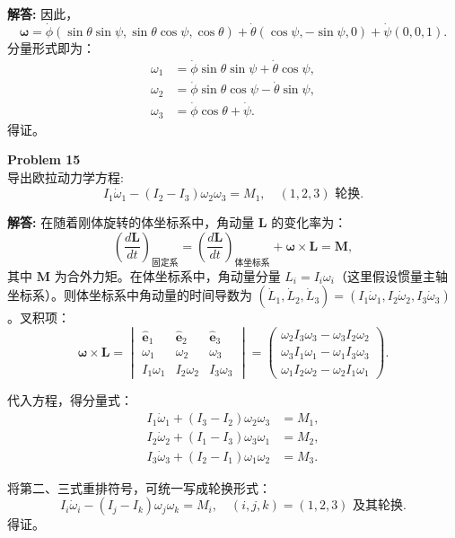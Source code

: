 \documentclass[12pt, a4paper, oneside]{ctexart}
\newenvironment{solution}{\par\noindent\textbf{解答:}\quad}{\par}
\begin{document}
\begin{solution}
    因此，
    \[
    \boldsymbol{\omega} = \dot{\phi} (\sin\theta \sin\psi, \sin\theta \cos\psi, \cos\theta) + \dot{\theta} (\cos\psi, -\sin\psi, 0) + \dot{\psi} (0,0,1).
    \]
    分量形式即为：
    \[
    \begin{aligned}
        \omega_1 &= \dot{\phi} \sin\theta \sin\psi + \dot{\theta} \cos\psi, \\
        \omega_2 &= \dot{\phi} \sin\theta \cos\psi - \dot{\theta} \sin\psi, \\
        \omega_3 &= \dot{\phi} \cos\theta + \dot{\psi}.
    \end{aligned}
    \]
    得证。
\end{solution}

\begin{mdframed}[backgroundcolor=gray!10, linewidth=0pt]
    \textbf{Problem 15} \\
    导出欧拉动力学方程:
    \[
    I_1\dot{\omega}_1 - (I_2 - I_3) \omega_2 \omega_3 = M_1, \quad (1,2,3) \text{ 轮换}.
    \]
\end{mdframed}
\begin{solution}
    在随着刚体旋转的体坐标系中，角动量 \(\mathbf{L}\) 的变化率为：
    \[
    \left( \frac{d \mathbf{L}}{dt} \right)_{\text{固定系}} = \left( \frac{d \mathbf{L}}{dt} \right)_{\text{体坐标系}} + \boldsymbol{\omega} \times \mathbf{L} = \mathbf{M},
    \]
    其中 \(\mathbf{M}\) 为合外力矩。在体坐标系中，角动量分量 \(L_i = I_i \omega_i\)（这里假设惯量主轴坐标系）。则体坐标系中角动量的时间导数为 \(( \dot{L}_1, \dot{L}_2, \dot{L}_3 ) = ( I_1 \dot{\omega}_1, I_2 \dot{\omega}_2, I_3 \dot{\omega}_3 )\)。叉积项：
    \[
    \boldsymbol{\omega} \times \mathbf{L} =
    \begin{vmatrix}
        \hat{\mathbf{e}}_1 & \hat{\mathbf{e}}_2 & \hat{\mathbf{e}}_3 \\
        \omega_1 & \omega_2 & \omega_3 \\
        I_1 \omega_1 & I_2 \omega_2 & I_3 \omega_3
    \end{vmatrix}
    = \begin{pmatrix}
        \omega_2 I_3 \omega_3 - \omega_3 I_2 \omega_2 \\
        \omega_3 I_1 \omega_1 - \omega_1 I_3 \omega_3 \\
        \omega_1 I_2 \omega_2 - \omega_2 I_1 \omega_1
    \end{pmatrix}.
    \]
    
    代入方程，得分量式：
    \[
    \begin{aligned}
        I_1 \dot{\omega}_1 + (I_3 - I_2) \omega_2 \omega_3 &= M_1, \\
        I_2 \dot{\omega}_2 + (I_1 - I_3) \omega_3 \omega_1 &= M_2, \\
        I_3 \dot{\omega}_3 + (I_2 - I_1) \omega_1 \omega_2 &= M_3.
    \end{aligned}
    \]
    
    将第二、三式重排符号，可统一写成轮换形式：
    \[
    I_i \dot{\omega}_i - (I_j - I_k) \omega_j \omega_k = M_i, \quad (i,j,k) = (1,2,3) \text{ 及其轮换}.
    \]
    得证。
\end{solution}
\end{document}
